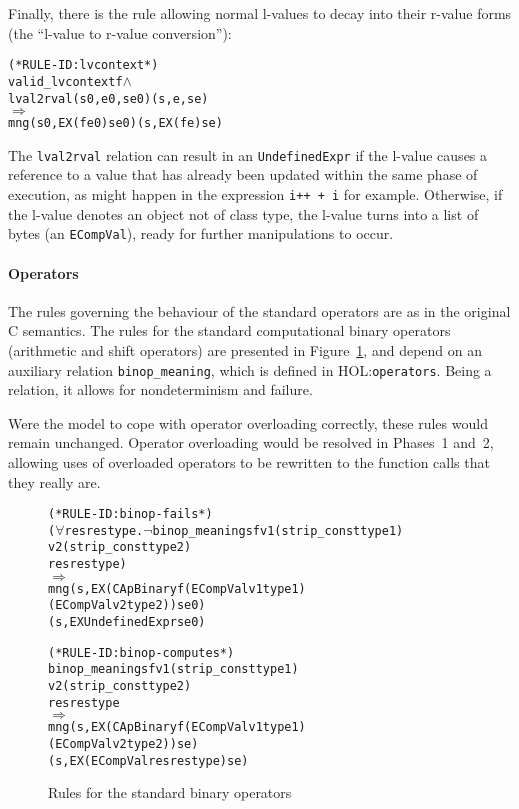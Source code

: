 \documentclass[11pt]{article}
\newcommand{\HOLfile}[1]{HOL:\texttt{#1}}
\begin{document}
Finally, there is the rule allowing normal l-values to decay into
their r-value forms (the ``l-value to r-value conversion''):
\begin{alltt}
(* RULE-ID: lvcontext *)
     valid_lvcontext f \(\land\)
     lval2rval (s0,e0,se0) (s,e,se)
   \(\Rightarrow\)
     mng (s0, EX (f e0) se0) (s, EX (f e) se)
\end{alltt}
The \texttt{lval2rval} relation can result in an
\texttt{UndefinedExpr} if the l-value causes a reference to a value
that has already been updated within the same phase of execution, as
might happen in the expression \texttt{i++ + i} for example.
Otherwise, if the l-value denotes an object not of class type, the
l-value turns into a list of bytes (an \texttt{ECompVal}), ready for
further manipulations to occur.

\paragraph{Operators} The rules governing the behaviour of the
standard operators are as in the original C semantics.  The rules for
the standard computational binary operators (arithmetic and shift
operators) are presented in Figure~\ref{fig:capbinary-rules}, and
depend on an auxiliary relation \texttt{binop_meaning}, which is
defined in \HOLfile{operators}.  Being a relation, it allows for
nondeterminism and failure.

Were the model to cope with operator overloading correctly, these
rules would remain unchanged.  Operator overloading would be resolved
in Phases~1 and~2, allowing uses of overloaded operators to be
rewritten to the function calls that they really are. 
\begin{figure}[htbp]
\begin{alltt}
(* RULE-ID: binop-fails *)
     (\(\forall\)res restype. \(\neg\)binop_meaning s f \(\!\)v1 (strip_const type1)
                                       v2 (strip_const type2)
                                       res restype)
   \(\Rightarrow\)
     mng (s, EX (CApBinary f (ECompVal v1 type1) 
                             (ECompVal v2 type2)) se0) 
         (s, EX UndefinedExpr se0)
\end{alltt}

\begin{alltt}
(* RULE-ID: binop-computes *)
     binop_meaning s f v1 (strip_const type1)
                       v2 (strip_const type2)
                       res restype
   \(\Rightarrow\)
     mng (s, EX (CApBinary f (ECompVal v1 type1) 
                             (ECompVal v2 type2)) se) 
         (s, EX (ECompVal res restype) se)
\end{alltt}
\caption{Rules for the standard binary operators}
\label{fig:capbinary-rules}
\end{figure}
\end{document}
